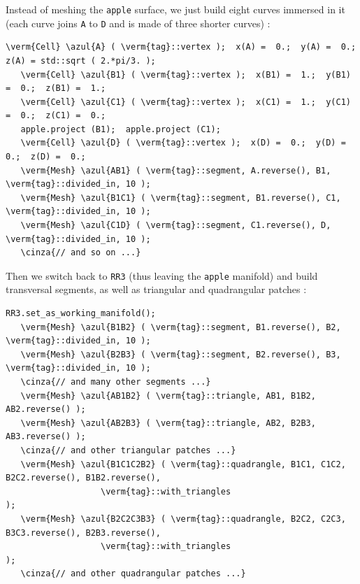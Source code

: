 Instead of meshing the {\small\tt apple} surface, we just build eight curves immersed in it
(each curve joins {\small\tt A} to {\small\tt D} and is made of three shorter curves) :

\begin{Verbatim}[commandchars=\\\{\},formatcom=\small\tt,frame=single,
   label=parag-\ref{\numb section 2.\numb parag 10}.cpp,rulecolor=\color{coment},
   baselinestretch=0.94,framesep=2mm]
   \verm{Cell} \azul{A} ( \verm{tag}::vertex );  x(A) =  0.;  y(A) =  0.;  z(A) = std::sqrt ( 2.*pi/3. );
   \verm{Cell} \azul{B1} ( \verm{tag}::vertex );  x(B1) =  1.;  y(B1) =  0.;  z(B1) =  1.;
   \verm{Cell} \azul{C1} ( \verm{tag}::vertex );  x(C1) =  1.;  y(C1) =  0.;  z(C1) =  0.;
   apple.project (B1);  apple.project (C1);
   \verm{Cell} \azul{D} ( \verm{tag}::vertex );  x(D) =  0.;  y(D) =  0.;  z(D) =  0.;
   \verm{Mesh} \azul{AB1} ( \verm{tag}::segment, A.reverse(), B1, \verm{tag}::divided_in, 10 );
   \verm{Mesh} \azul{B1C1} ( \verm{tag}::segment, B1.reverse(), C1, \verm{tag}::divided_in, 10 );
   \verm{Mesh} \azul{C1D} ( \verm{tag}::segment, C1.reverse(), D, \verm{tag}::divided_in, 10 );
   \cinza{// and so on ...}
\end{Verbatim}

Then we switch back to {\small\tt RR3} (thus leaving the {\small\tt apple} manifold) and build
transversal segments, as well as triangular and quadrangular patches :

\begin{Verbatim}[commandchars=\\\{\},formatcom=\small\tt,frame=single,
   label=parag-\ref{\numb section 2.\numb parag 10}.cpp,rulecolor=\color{coment},
   baselinestretch=0.94,framesep=2mm]
   RR3.set_as_working_manifold();
   \verm{Mesh} \azul{B1B2} ( \verm{tag}::segment, B1.reverse(), B2, \verm{tag}::divided_in, 10 );
   \verm{Mesh} \azul{B2B3} ( \verm{tag}::segment, B2.reverse(), B3, \verm{tag}::divided_in, 10 );
   \cinza{// and many other segments ...}
   \verm{Mesh} \azul{AB1B2} ( \verm{tag}::triangle, AB1, B1B2, AB2.reverse() );
   \verm{Mesh} \azul{AB2B3} ( \verm{tag}::triangle, AB2, B2B3, AB3.reverse() );
   \cinza{// and other triangular patches ...}
   \verm{Mesh} \azul{B1C1C2B2} ( \verm{tag}::quadrangle, B1C1, C1C2, B2C2.reverse(), B1B2.reverse(),
                   \verm{tag}::with_triangles                                           );
   \verm{Mesh} \azul{B2C2C3B3} ( \verm{tag}::quadrangle, B2C2, C2C3, B3C3.reverse(), B2B3.reverse(),
                   \verm{tag}::with_triangles                                           );
   \cinza{// and other quadrangular patches ...}   
\end{Verbatim}

